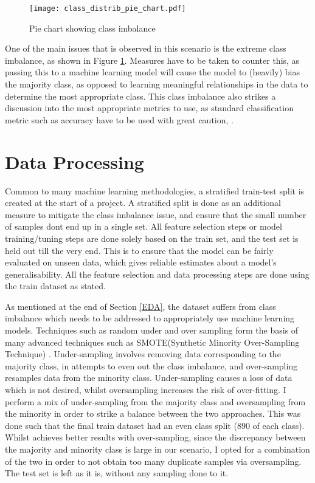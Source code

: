 \documentclass[11pt]{article}
\begin{document}
\begin{figure}
    \centering
    \texttt{[image: class\_distrib\_pie\_chart.pdf]}
    \caption{Pie chart showing class imbalance}
    \label{fig:ClassImbalance}
\end{figure}
One of the main issues that is observed in this scenario is the extreme class imbalance, as shown in Figure \ref{fig:ClassImbalance}. Measures have to be taken to counter this, as passing this to a machine learning model will cause the model to (heavily) bias the majority class, as opposed to learning meaningful relationships in the data to determine the most appropriate class. This class imbalance also strikes a discussion into the most appropriate metrics to use, as standard classification metric such as accuracy have to be used with great caution, \cite{accuracy_misleading}.

\section{Data Processing}

Common to many machine learning methodologies, a stratified train-test split is created at the start of a project. A stratified split is done as an additional measure to mitigate the class imbalance issue, and ensure that the small number of samples dont end up in a single set. All feature selection steps or model training/tuning steps are done solely based on the train set, and the test set is held out till the very end. This is to ensure that the model can be fairly evaluated on unseen data, which gives reliable estimates about a model's generalisability. All the feature selection and data processing steps are done using the train dataset as stated. 

As mentioned at the end of Section \ref{EDA}, the dataset suffers from class imbalance which needs to be addressed to appropriately use machine learning models. Techniques such as random under and over sampling form the basis of many advanced techniques such as SMOTE(Synthetic Minority Over-Sampling Technique) \cite{smote}. Under-sampling involves removing data corresponding to the majority class, in attempts to even out the class imbalance, and over-sampling resamples data from the minority class. Under-sampling causes a loss of data which is not desired, whilst oversampling increases the risk of over-fitting. I perform a mix of under-sampling from the majority class and oversampling from the minority in order to strike a balance between the two approaches. This was done such that the final train dataset had an even class split ($890$ of each class). Whilst \cite{under_over_sampling} achieves better results with over-sampling, since the discrepancy between the majority and minority class is large in our scenario, I opted for a combination of the two in order to not obtain too many duplicate samples via oversampling. The test set is left as it is, without any sampling done to it.\\
\end{document}

